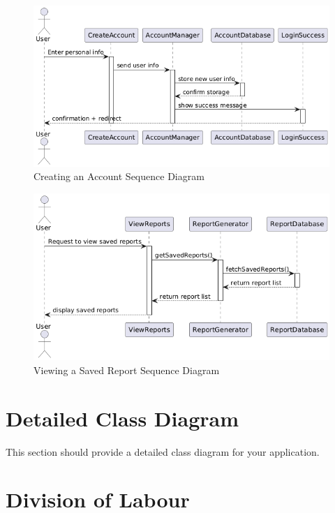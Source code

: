 \documentclass[]{article}
\numberwithin{figure}{section}
\begin{document}
\begin{figure}[h]
    \centering
    \includegraphics[scale=0.7]{CreateAccount_sequence.png}
    \caption{Creating an Account Sequence Diagram}
    \label{fig:CreateAccount_sequence}
\end{figure}
\clearpage

\begin{figure}[h]
    \centering
    \includegraphics[scale=0.7]{ViewSavedReports_sequence.png}
    \caption{Viewing a Saved Report Sequence Diagram}
    \label{fig:ViewSavedReports_sequence}
\end{figure}
\clearpage

\section{Detailed Class Diagram}
\label{sec:detailed_class_diagram}
This section should provide a detailed class diagram for your application.

\appendix
\section{Division of Labour}
\label{sec:division_of_labour}
\end{document}
